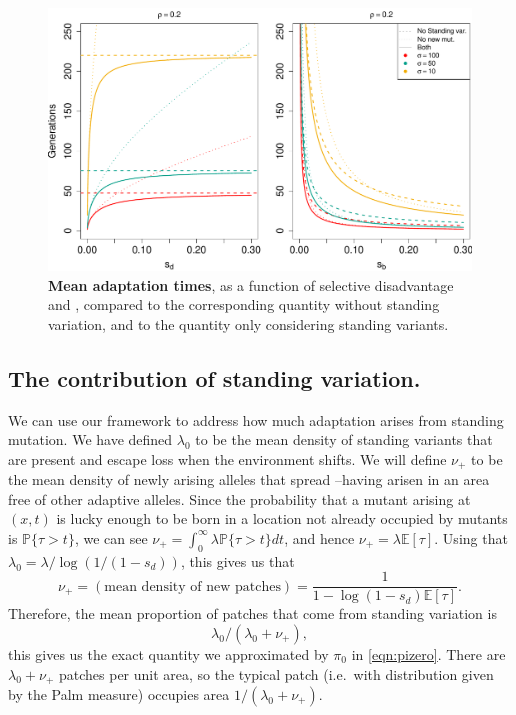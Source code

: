 \documentclass{article}
\renewcommand{\P}{\mathbb{P}}
\newcommand{\E}{\mathbb{E}}
\begin{document}
\begin{figure}[ht]
\begin{center}
  \includegraphics[width=1.0\textwidth]{G6PD_chartimes_sd_sb.pdf}   %
\caption{ %
{\bf Mean adaptation times}, as a function of selective disadvantage
and , compared to the corresponding quantity without standing variation, and to the quantity only considering standing variants.
} \label{G6PD_chartimes}
\end{center}
\end{figure}


\subsection{The contribution of standing variation.}
We can use our framework to address how much adaptation arises from
standing mutation. We have defined $\lambda_0$ to be the mean density
of standing variants that are present and escape loss when the
environment shifts.
We will define $\nu_+$ to be the mean density of newly arising alleles
that spread --having arisen in an area free of other adaptive alleles.
Since the probability that a mutant arising at $(x,t)$ is lucky enough to be born in a location not already occupied by mutants
is $\P\{ \tau > t \}$,
we can see  $\nu_+ = \int_0^\infty \lambda \P\{\tau>t\} dt$, and hence
$\nu_+ = \lambda \E[\tau] $.
Using that $\lambda_0 = \lambda / \log(1/(1-s_d))$, this gives us that
\begin{equation}
    \nu_+ = (\mbox{mean density of new patches}) = \frac{1}{1-\log(1-s_d) \E[\tau]} .
\end{equation}
Therefore, the mean proportion of patches that come from standing variation
is 
\begin{equation} \label{prop_patches_standing}
\lambda_0 / (\lambda_0 + \nu_+),
\end{equation}
this gives us the exact quantity we approximated by $\pi_0$ in \eqref{eqn:pizero}.
There are $\lambda_0 + \nu_+$ patches per unit area, so
the typical patch (i.e.\ with distribution given by the Palm measure) occupies area $1/(\lambda_0 + \nu_+)$.
\end{document}
